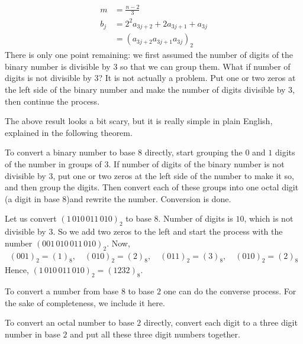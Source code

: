 \begin{align*}
	m
		& =\frac{n-2}{3}\\
	b_j
		& = 2^2a_{3j+2} + 2a_{3j+1} + a_{3j}\\
		& = (a_{3j+2}a_{3j+1}a_{3j})_2
\end{align*}
There is only one point remaining: we first assumed the number of digits of the binary number is divisible by $3$ so that we can group them. What if number of digits is not divisible by $3$? It is not actually a problem. Put one or two zeros at the left side of the binary number and make the number of digits divisible by $3$, then continue the process.

The above result looks a bit scary, but it is really simple in plain English, explained in the following theorem.

\begin{theorem}
	To convert a binary number to base $8$ directly, start grouping the $0$ and $1$ digits of the number in groups of $3$. If number of digits of the binary number is not divisible by $3$, put one or two zeros at the left side of the number to make it so, and then group the digits. Then convert each of these groups into one octal digit (a digit in base $8$)and rewrite the number. Conversion is done.
\end{theorem}

\begin{example}
	Let us convert $({1\,010\,011\,010})_2$ to base $8$. Number of digits is $10$, which is not divisible by $3$. So we add two zeros to the left and start the process with the number $({001\,010\,011\,010})_2$. Now,
	\begin{align*}
		({001})_2 = (\textit{1})_8, \quad ({010})_2 = (\textit{2})_8,  \quad ({011})_2 = (\textit{3})_8, \quad ({010})_2 = (\textit{2})_8
	\end{align*}
	Hence, $({1\,010\,011\,010})_2 = ({1232})_8$.
\end{example}
To convert a number from base $8$ to base $2$ one can do the converse process. For the sake of completeness, we include it here.
\begin{theorem}
	To convert an octal number to base $2$ directly, convert each digit to a three digit number in base $2$ and put all these three digit numbers together.
\end{theorem}

